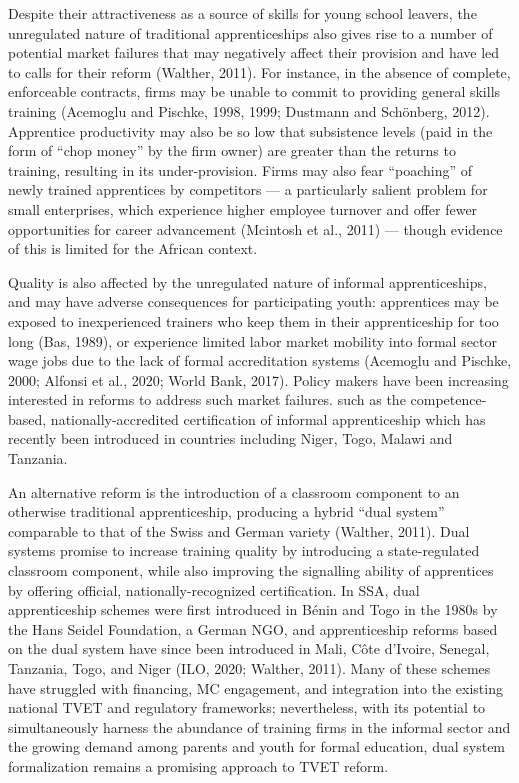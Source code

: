 \documentclass[
  11pt,
a4paper
]{article}
\begin{document}
Despite their attractiveness as a source of skills for young school leavers, the unregulated nature of traditional apprenticeships also gives rise to a number of potential market failures that may negatively affect their provision and have led to calls for their reform (Walther, 2011). For instance, in the absence of complete, enforceable contracts, firms may be unable to commit to providing general skills training (Acemoglu and Pischke, 1998, 1999; Dustmann and Schönberg, 2012). Apprentice productivity may also be so low that subsistence levels (paid in the form of ``chop money'' by the firm owner) are greater than the returns to training, resulting in its under-provision. Firms may also fear ``poaching'' of newly trained apprentices by competitors --- a particularly salient problem for small enterprises, which experience higher employee turnover and offer fewer opportunities for career advancement (Mcintosh et al., 2011) --- though evidence of this is limited for the African context.

Quality is also affected by the unregulated nature of informal apprenticeships, and may have adverse consequences for participating youth: apprentices may be exposed to inexperienced trainers who keep them in their apprenticeship for too long (Bas, 1989), or experience limited labor market mobility into formal sector wage jobs due to the lack of formal accreditation systems (Acemoglu and Pischke, 2000; Alfonsi et al., 2020; World Bank, 2017). Policy makers have been increasing interested in reforms to address such market failures. such as the competence-based, nationally-accredited certification of informal apprenticeship which has recently been introduced in countries including Niger, Togo, Malawi and Tanzania.

An alternative reform is the introduction of a classroom component to an otherwise traditional apprenticeship, producing a hybrid ``dual system'' comparable to that of the Swiss and German variety (Walther, 2011). Dual systems promise to increase training quality by introducing a state-regulated classroom component, while also improving the signalling ability of apprentices by offering official, nationally-recognized certification. In SSA, dual apprenticeship schemes were first introduced in Bénin and Togo in the 1980s by the Hans Seidel Foundation, a German NGO, and apprenticeship reforms based on the dual system have since been introduced in Mali, Côte d'Ivoire, Senegal, Tanzania, Togo, and Niger (ILO, 2020; Walther, 2011). Many of these schemes have struggled with financing, MC engagement, and integration into the existing national TVET and regulatory frameworks; nevertheless, with its potential to simultaneously harness the abundance of training firms in the informal sector and the growing demand among parents and youth for formal education, dual system formalization remains a promising approach to TVET reform.
\end{document}
